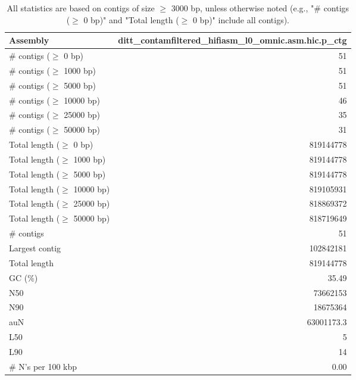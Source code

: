 \documentclass[12pt,a4paper]{article}
\begin{document}
\begin{table}[ht]
\begin{center}
\caption{All statistics are based on contigs of size $\geq$ 3000 bp, unless otherwise noted (e.g., "\# contigs ($\geq$ 0 bp)" and "Total length ($\geq$ 0 bp)" include all contigs).}
\begin{tabular}{|l*{1}{|r}|}
\hline
Assembly & ditt\_contamfiltered\_hifiasm\_l0\_omnic.asm.hic.p\_ctg \\ \hline
\# contigs ($\geq$ 0 bp) & 51 \\ \hline
\# contigs ($\geq$ 1000 bp) & 51 \\ \hline
\# contigs ($\geq$ 5000 bp) & 51 \\ \hline
\# contigs ($\geq$ 10000 bp) & 46 \\ \hline
\# contigs ($\geq$ 25000 bp) & 35 \\ \hline
\# contigs ($\geq$ 50000 bp) & 31 \\ \hline
Total length ($\geq$ 0 bp) & 819144778 \\ \hline
Total length ($\geq$ 1000 bp) & 819144778 \\ \hline
Total length ($\geq$ 5000 bp) & 819144778 \\ \hline
Total length ($\geq$ 10000 bp) & 819105931 \\ \hline
Total length ($\geq$ 25000 bp) & 818869372 \\ \hline
Total length ($\geq$ 50000 bp) & 818719649 \\ \hline
\# contigs & 51 \\ \hline
Largest contig & 102842181 \\ \hline
Total length & 819144778 \\ \hline
GC (\%) & 35.49 \\ \hline
N50 & 73662153 \\ \hline
N90 & 18675364 \\ \hline
auN & 63001173.3 \\ \hline
L50 & 5 \\ \hline
L90 & 14 \\ \hline
\# N's per 100 kbp & 0.00 \\ \hline
\end{tabular}
\end{center}
\end{table}
\end{document}

